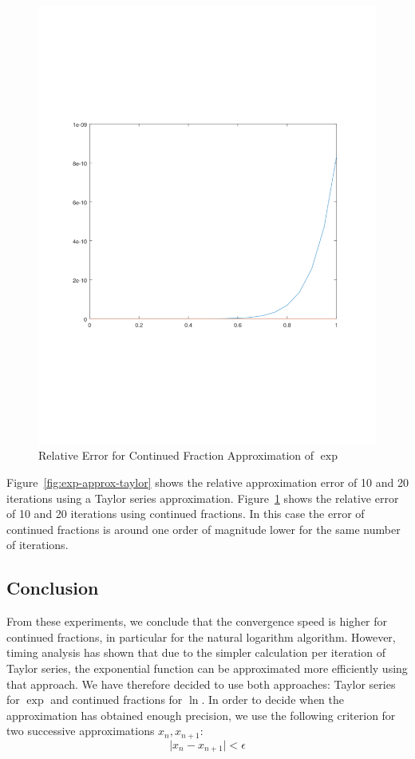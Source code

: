 \documentclass[11pt,a4paper,dvipsnames,twosided]{article}
\theoremstyle{definition}
\theoremstyle{definition}
\begin{document}
\begin{figure}[ht]
  \centering
    \includegraphics[width=\textwidth]{cf_exp}
  \caption{Relative Error for Continued Fraction Approximation of  $\exp$}
  \label{fig:exp-approx-cf}
\end{figure}

Figure~\ref{fig:exp-approx-taylor} shows the relative approximation error of 10
and 20 iterations using a Taylor series approximation. Figure~\ref{fig:exp-approx-cf}
shows the relative error of 10 and 20 iterations using continued fractions. In
this case the error of continued fractions is around one order of magnitude
lower for the same number of iterations.

\subsection{Conclusion}
\label{sec:conclusion}

From these experiments, we conclude that the convergence speed is higher for
continued fractions, in particular for the natural logarithm algorithm. However,
timing analysis has shown that due to the simpler calculation per iteration of
Taylor series, the exponential function can be approximated more efficiently
using that approach. We have therefore decided to use both approaches: Taylor series for $\exp$
and continued fractions for $\ln$.  In order to decide when the approximation has obtained enough precision,
we use the following criterion for two successive approximations $x_{n}, x_{n+1}$:
\begin{equation*}
  \vert x_{n} - x_{n+1}\vert < \epsilon
\end{equation*}
\end{document}
